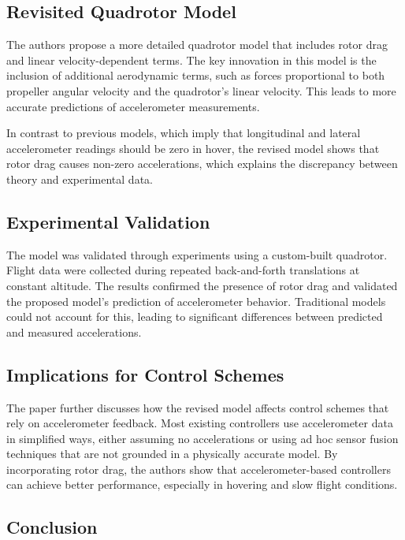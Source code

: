 \documentclass[a4paper,12pt]{article}
\begin{document}
\subsection{Revisited Quadrotor Model}

The authors propose a more detailed quadrotor model that includes rotor drag and linear velocity-dependent terms. The key innovation in this model is the inclusion of additional aerodynamic terms, such as forces proportional to both propeller angular velocity and the quadrotor's linear velocity. This leads to more accurate predictions of accelerometer measurements.

In contrast to previous models, which imply that longitudinal and lateral accelerometer readings should be zero in hover, the revised model shows that rotor drag causes non-zero accelerations, which explains the discrepancy between theory and experimental data.

\subsection{Experimental Validation}

The model was validated through experiments using a custom-built quadrotor. Flight data were collected during repeated back-and-forth translations at constant altitude. The results confirmed the presence of rotor drag and validated the proposed model’s prediction of accelerometer behavior. Traditional models could not account for this, leading to significant differences between predicted and measured accelerations.

\subsection{Implications for Control Schemes}

The paper further discusses how the revised model affects control schemes that rely on accelerometer feedback. Most existing controllers use accelerometer data in simplified ways, either assuming no accelerations or using ad hoc sensor fusion techniques that are not grounded in a physically accurate model. By incorporating rotor drag, the authors show that accelerometer-based controllers can achieve better performance, especially in hovering and slow flight conditions.

\subsection{Conclusion}
\end{document}
